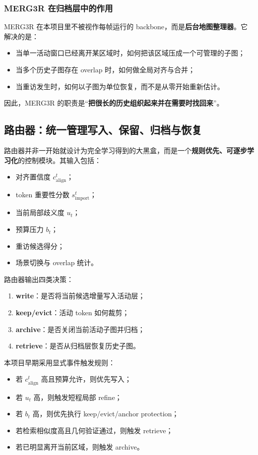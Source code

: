 \documentclass[12pt]{article}
\begin{document}
\subsubsection{MERG3R 在归档层中的作用}

MERG3R 在本项目里不被视作每帧运行的 backbone，而是\textbf{后台地图整理器}。它解决的是：
\begin{itemize}
  \item 当单一活动窗口已经离开某区域时，如何把该区域压成一个可管理的子图；
  \item 当多个历史子图存在 overlap 时，如何做全局对齐与合并；
  \item 当重访发生时，如何以子图为单位恢复，而不是从零开始重新估计。
\end{itemize}

因此，MERG3R 的职责是“\textbf{把很长的历史组织起来并在需要时找回来}”。

\subsection{路由器：统一管理写入、保留、归档与恢复}

路由器并非一开始就设计为完全学习得到的大黑盒，而是一个\textbf{规则优先、可逐步学习化}的控制模块。其输入包括：
\begin{itemize}
  \item 对齐置信度 $c_{\text{align}}^t$；
  \item token 重要性分数 $s_{\text{import}}^t$；
  \item 当前局部歧义度 $u_t$；
  \item 预算压力 $b_t$；
  \item 重访候选得分；
  \item 场景切换与 overlap 统计。
\end{itemize}

路由器输出四类决策：
\begin{enumerate}
  \item \textbf{write}：是否将当前候选增量写入活动层；
  \item \textbf{keep/evict}：活动 token 如何裁剪；
  \item \textbf{archive}：是否关闭当前活动子图并归档；
  \item \textbf{retrieve}：是否从归档层恢复历史子图。
\end{enumerate}

本项目早期采用显式事件触发规则：
\begin{itemize}
  \item 若 $c_{\text{align}}^t$ 高且预算允许，则优先写入；
  \item 若 $u_t$ 高，则触发短程局部 refine；
  \item 若 $b_t$ 高，则优先执行 keep/evict/anchor protection；
  \item 若检索相似度高且几何验证通过，则触发 retrieve；
  \item 若已明显离开当前区域，则触发 archive。
\end{itemize}
\end{document}

